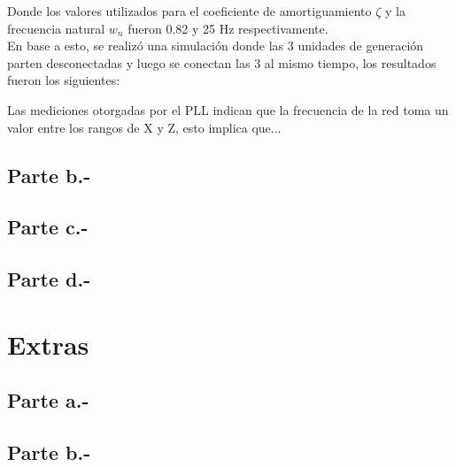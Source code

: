 Donde los valores utilizados para el coeficiente de amortiguamiento $\zeta$ y la frecuencia natural $w_{n}$ fueron 0.82 y 25 Hz respectivamente.\\

En base a esto, se realizó una simulación donde las 3 unidades de generación parten desconectadas y luego se conectan las 3 al mismo tiempo, los resultados fueron los siguientes:



Las mediciones otorgadas por el PLL indican que la frecuencia de la red toma un valor entre los rangos de X y Z, esto implica que...

\subsection{Parte b.-}



\subsection{Parte c.-}



\subsection{Parte d.-}



\section{Extras}

\subsection{Parte a.-}



\subsection{Parte b.-}



